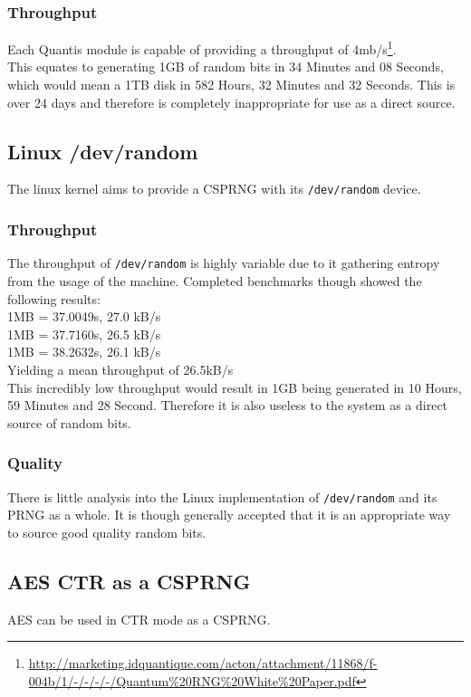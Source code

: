 \documentclass{paper}
\begin{document}
			\subsubsection{Throughput}
				Each Quantis module is capable of providing a throughput of 4mb/s\footnote{\url{http://marketing.idquantique.com/acton/attachment/11868/f-004b/1/-/-/-/-/Quantum\%20RNG\%20White\%20Paper.pdf}}.\\
				This equates to generating 1GB of random bits in 34 Minutes and 08 Seconds, which would mean a 1TB disk in 582 Hours, 32 Minutes and 32 Seconds. This is over 24 days and therefore is completely inappropriate for use as a direct source.\\
			
		\subsection{Linux /dev/random}
		The linux kernel aims to provide a CSPRNG with its \texttt{/dev/random} device.
			\subsubsection{Throughput}
				The throughput of \texttt{/dev/random} is highly variable due to it gathering entropy from the usage of the machine. Completed benchmarks though showed the following results:\\	
				1MB = 37.0049s, 27.0 kB/s\\
				1MB = 37.7160s, 26.5 kB/s\\
				1MB = 38.2632s, 26.1 kB/s\\
				Yielding a mean throughput of 26.5kB/s\\
				
				This incredibly low throughput would result in 1GB being generated in 10 Hours, 59 Minutes and 28 Second. Therefore it is also useless to the system as a direct source of random bits.\\
			\subsubsection{Quality}
				There is little analysis into the Linux implementation of  \texttt{/dev/random} and its PRNG as a whole. It is though generally accepted that it is an appropriate way to source good quality random bits.\\
			
		\subsection{AES CTR as a CSPRNG}
			AES can be used in CTR mode as a CSPRNG.\\
\end{document}

